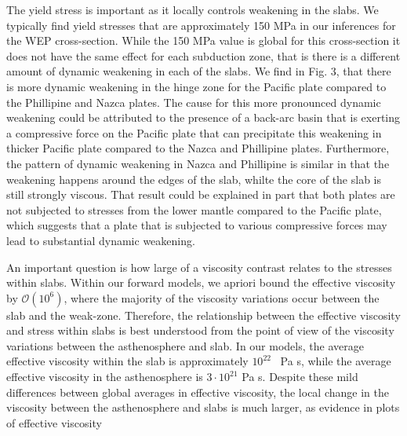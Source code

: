 \documentclass[12pt]{article}
\begin{document}
{  The yield stress is important as it locally controls weakening in the slabs. We typically find yield stresses that are approximately 150 MPa in our inferences for the WEP cross-section. While the 150 MPa value is global for this cross-section it does not have the same effect for each subduction zone, that is there is a different amount of dynamic weakening in each of the slabs. We find in Fig. 3, that there is more dynamic weakening in the hinge zone for the Pacific plate compared to the Phillipine and Nazca plates. The cause for this more pronounced dynamic weakening could be attributed to the presence of a back-arc basin that is exerting a compressive force on the Pacific plate that can precipitate this weakening in thicker Pacific plate compared to the Nazca and Phillipine plates. Furthermore, the pattern of dynamic weakening in Nazca and Phillipine is similar in that the weakening happens around the edges of the slab, whilte the core of the slab is still strongly viscous. That result could be explained in part that both plates are not subjected to stresses from the lower mantle compared to the Pacific plate, which suggests that a plate that is subjected to various compressive forces may lead to substantial dynamic weakening. 
  
  
  An important question is how large of a viscosity contrast relates to the stresses within slabs. Within our forward models, we apriori bound the effective viscosity by $\mathcal{O}(10^6)$, where the majority of the viscosity variations occur between the slab and the weak-zone. Therefore, the relationship between the effective viscosity and stress within slabs is best understood from the point of view of the viscosity variations between the asthenosphere and slab. In our models, the average effective viscosity within the slab is approximately $10^{22}$ ~Pa s, while the average effective viscosity in the asthenosphere is $3\cdot 10^{21}$ Pa s. 
Despite these mild differences between global averages in effective viscosity, the local change in the viscosity between the asthenosphere and slabs is much larger, as evidence in plots of effective viscosity   

}
\end{document}

